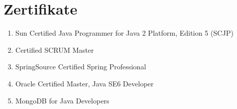 \section*{Zertifikate}
\begin{enumerate}[label=,leftmargin=0cm,itemsep=10pt]
\item Sun Certified Java Programmer for Java 2 Platform, Edition 5 (SCJP)
\item Certified SCRUM Master
\item SpringSource Certified Spring Professional
\item Oracle Certified Master, Java SE6 Developer
\item MongoDB for Java Developers
\end{enumerate}
